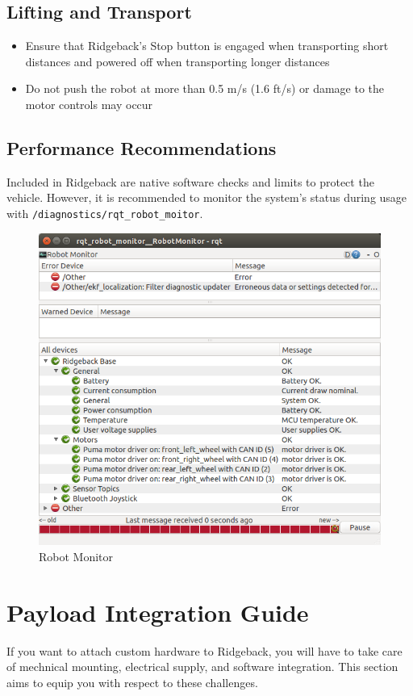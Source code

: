 \documentclass[]{clearpath-latex/clearpath-manual}
\begin{document}
\subsection{Lifting and Transport}

\begin{itemize}[nolistsep]
	\item Ensure that Ridgeback's Stop button is engaged when transporting short distances and powered off when transporting longer distances
	\item Do not push the robot at more than 0.5 m/s (1.6 ft/s) or damage to the motor controls may occur
\end{itemize}

\subsection{Performance Recommendations}

Included in Ridgeback are native software checks and limits to protect the vehicle. However, it is recommended to monitor the system’s status during usage with \lstinline{/diagnostics/rqt_robot_moitor}.

\begin{figure}[!htb]
  \centering
  \includegraphics[width=0.75\linewidth]{rqt_robot_monitor.png}
  \caption{Robot Monitor}
  \label{robotmonitor}
\end{figure}


\section{Payload Integration Guide}

If you want to attach custom hardware to Ridgeback, you will have to take care of mechnical mounting, electrical supply, and software integration.  This section aims to equip you with respect to these challenges.
\end{document}
